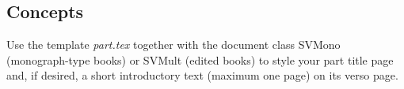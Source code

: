 % 
%
%

\begin{partbacktext}
\part{Concepts}
\noindent Use the template \emph{part.tex} together with the document class SVMono (monograph-type books) or SVMult (edited books) to style your part title page and, if desired, a short introductory text (maximum one page) on its verso page.

\end{partbacktext}
